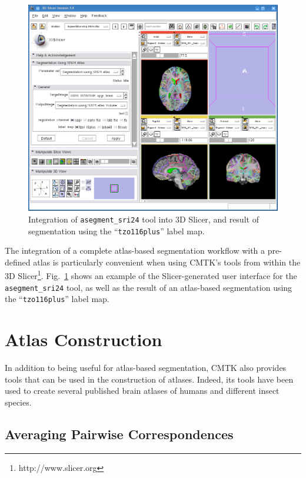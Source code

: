 \documentclass{InsightArticle}
\begin{document}
\begin{figure}[tb]
\centerline{\includegraphics[width=\linewidth]{img/slicer-asegment_sri24}}
\caption{Integration of {\tt asegment\_sri24} tool into 3D Slicer, and result
  of segmentation using the ``{\tt tzo116plus}'' label map.}
\label{fig:SlicerSRI24}
\end{figure}

The integration of a complete atlas-based segmentation workflow with a
pre-defined atlas is particularly convenient when using CMTK's tools from
within the 3D
Slicer\footnote{http://www.slicer.org}. Fig.~\ref{fig:SlicerSRI24} shows an
example of the Slicer-generated user interface for the \verb|asegment_sri24|
tool, as well as the result of an atlas-based segmentation using the
``\verb|tzo116plus|'' label map.

\clearpage
\section{Atlas Construction}

In addition to being useful for atlas-based segmentation, CMTK also provides
tools that can be used in the construction of atlases. Indeed, its tools have
been used to create several published brain atlases of humans and different
insect species.

\subsection{Averaging Pairwise Correspondences}
\end{document}
